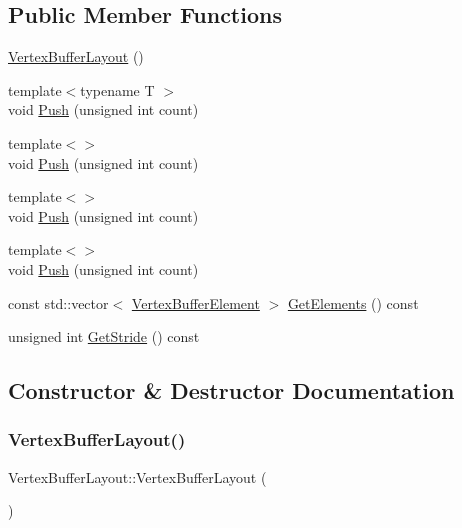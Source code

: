 \subsection*{Public Member Functions}
\begin{DoxyCompactItemize}
\item 
\mbox{\hyperlink{class_vertex_buffer_layout_a1e10e1d0c533a91948466fa4f88bab09}{Vertex\+Buffer\+Layout}} ()
\item 
{\footnotesize template$<$typename T $>$ }\\void \mbox{\hyperlink{class_vertex_buffer_layout_a7e1ef819bf5dc21d20bb38d9c6914aa5}{Push}} (unsigned int count)
\item 
{\footnotesize template$<$$>$ }\\void \mbox{\hyperlink{class_vertex_buffer_layout_a0ac1e4373209bf1a2c5c3551f690724b}{Push}} (unsigned int count)
\item 
{\footnotesize template$<$$>$ }\\void \mbox{\hyperlink{class_vertex_buffer_layout_a0ac1e4373209bf1a2c5c3551f690724b}{Push}} (unsigned int count)
\item 
{\footnotesize template$<$$>$ }\\void \mbox{\hyperlink{class_vertex_buffer_layout_a0ac1e4373209bf1a2c5c3551f690724b}{Push}} (unsigned int count)
\item 
const std\+::vector$<$ \mbox{\hyperlink{struct_vertex_buffer_element}{Vertex\+Buffer\+Element}} $>$ \mbox{\hyperlink{class_vertex_buffer_layout_a9d81400c5f992ed1f287aa75267eb2f4}{Get\+Elements}} () const
\item 
unsigned int \mbox{\hyperlink{class_vertex_buffer_layout_aca33593016f0360720489d25b933ac4a}{Get\+Stride}} () const
\end{DoxyCompactItemize}


\subsection{Constructor \& Destructor Documentation}
\mbox{\label{class_vertex_buffer_layout_a1e10e1d0c533a91948466fa4f88bab09}} 
\subsubsection{\texorpdfstring{Vertex\+Buffer\+Layout()}{VertexBufferLayout()}}
{\footnotesize\ttfamily Vertex\+Buffer\+Layout\+::\+Vertex\+Buffer\+Layout (\begin{DoxyParamCaption}{ }\end{DoxyParamCaption})\hspace{0.3cm}{\ttfamily [inline]}}



